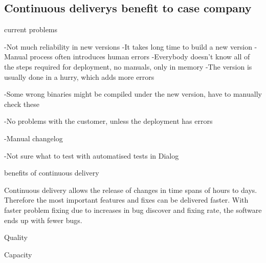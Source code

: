 \documentclass[english]{tktltiki2}
\theoremstyle{definition}
\theoremstyle{remark}
\begin{document}
\subsection{Continuous deliverys benefit to case company}

current problems 

-Not much reliability in new versions
-It takes long time to build a new version
-Manual process often introduces human errors
-Everybody doesn't know all of the steps required for deployment, no manuals, only in memory
-The version is usually done in a hurry, which adds more errors

-Some wrong binaries might be compiled under the new version, have to manually check these

-No problems with the customer, unless the deployment has errors

-Manual changelog

-Not sure what to test with automatised tests in Dialog


benefits of continuous delivery

Continuous delivery allows the release of changes in time spans of hours to days. Therefore the most important features and fixes can be delivered faster. With faster problem fixing due to increases in bug discover and fixing rate, the software ends up with fewer bugs. 

Quality

Capacity
\end{document}
